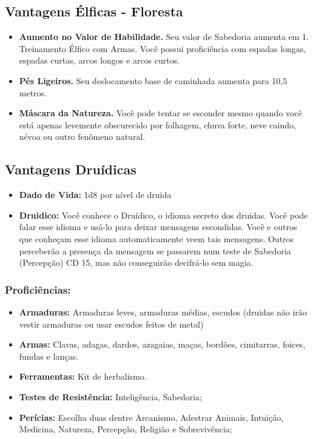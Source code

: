 \documentclass[a4paper,12p]{book}
\begin{document}
\begin{multicols}{2}
		\subsection{Vantagens Élficas - Floresta}
			\begin{itemize}
				\item \textbf{Aumento no Valor de Habilidade.} Seu valor de
				Sabedoria aumenta em 1.
				Treinamento Élfico com Armas. Você possui
				proficiência com espadas longas, espadas curtas, arcos
				longos e arcos curtos.
				\item \textbf{Pés Ligeiros.} Seu deslocamento base de caminhada
				aumenta para 10,5 metros.
				\item \textbf{Máscara da Natureza.} Você pode tentar se esconder
				mesmo quando você está apenas levemente obscurecido
				por folhagem, chuva forte, neve caindo, névoa ou outro
				fenômeno natural.
			\end{itemize}
	
	\columnbreak
	
	\subsection{Vantagens Druídicas}
		
		\begin{itemize}
			\item \textbf{Dado de Vida:} 1d8 por nível de druida
			\item \textbf{Druidico:} Você conhece o Druídico, o idioma secreto dos druidas. Você pode falar esse idioma e usá-lo para deixar mensagens escondidas. Você e outros que conheçam esse idioma automaticamente veem tais mensagens. Outros	perceberão a presença da mensagem se passarem num teste de Sabedoria (Percepção) CD 15, mas não conseguirão decifrá-lo sem magia.
		\end{itemize}
	\subsubsection{Proficiências:}
		\begin{itemize}
			\item \textbf{Armaduras:} Armaduras leves, armaduras médias, escudos (druidas não irão vestir armaduras ou usar escudos feitos de metal)
			\item \textbf{Armas:} Clavas, adagas, dardos, azagaias, maças, bordões, cimitarras, foices, fundas e lanças.
			\item \textbf{Ferramentas:} Kit de herbalismo.
			\item \textbf{Testes de Resistência:} Inteligência, Sabedoria;
			\item \textbf{Perícias:} Escolha duas dentre Arcanismo, Adestrar Animais, Intuição, Medicina, Natureza, Percepção, Religião e Sobrevivência;
		\end{itemize}

\end{multicols}
\end{document}
